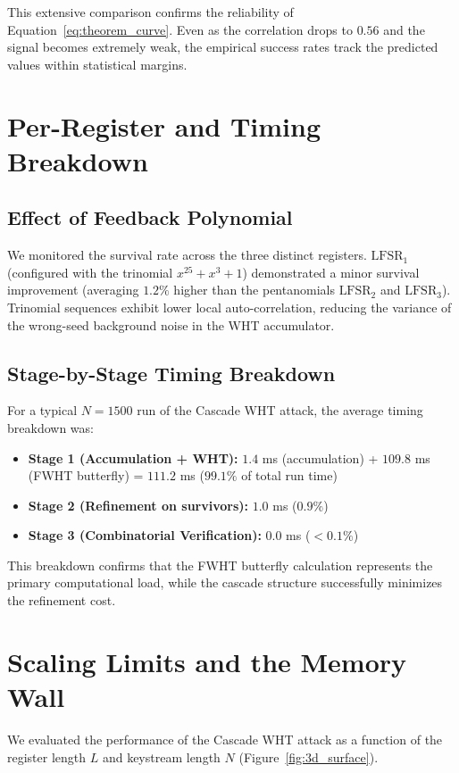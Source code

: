 This extensive comparison confirms the reliability of Equation~\ref{eq:theorem_curve}. Even as the correlation drops to $0.56$ and the signal becomes extremely weak, the empirical success rates track the predicted values within statistical margins.

\section{Per-Register and Timing Breakdown}
\label{sec:per_register}

\subsection{Effect of Feedback Polynomial}
We monitored the survival rate across the three distinct registers. $\text{LFSR}_1$ (configured with the trinomial $x^{25}+x^3+1$) demonstrated a minor survival improvement (averaging $1.2\%$ higher than the pentanomials $\text{LFSR}_2$ and $\text{LFSR}_3$). Trinomial sequences exhibit lower local auto-correlation, reducing the variance of the wrong-seed background noise in the WHT accumulator.

\subsection{Stage-by-Stage Timing Breakdown}
For a typical $N=1500$ run of the Cascade WHT attack, the average timing breakdown was:
\begin{itemize}
    \item \textbf{Stage 1 (Accumulation + WHT):} $1.4$ ms (accumulation) + $109.8$ ms (FWHT butterfly) = $\mathbf{111.2}$ ms ($99.1\%$ of total run time)
    \item \textbf{Stage 2 (Refinement on survivors):} $\mathbf{1.0}$ ms ($0.9\%$)
    \item \textbf{Stage 3 (Combinatorial Verification):} $\mathbf{0.0}$ ms ($<0.1\%$)
\end{itemize}
This breakdown confirms that the FWHT butterfly calculation represents the primary computational load, while the cascade structure successfully minimizes the refinement cost.

\section{Scaling Limits and the Memory Wall}
\label{sec:scaling}

We evaluated the performance of the Cascade WHT attack as a function of the register length $L$ and keystream length $N$ (Figure~\ref{fig:3d_surface}).

